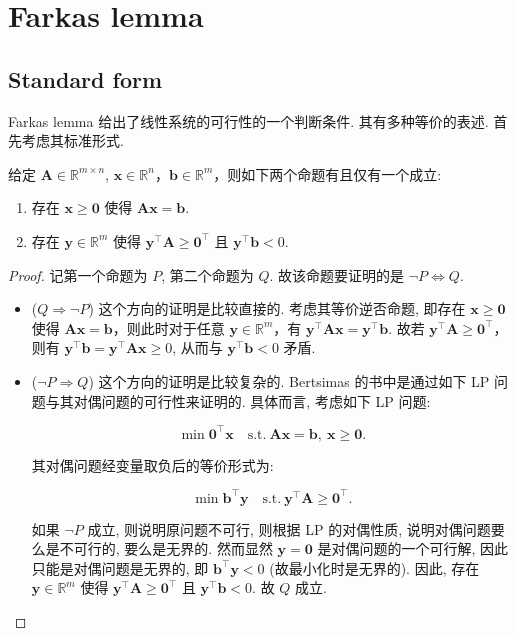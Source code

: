 \section{Farkas lemma}

\subsection{Standard form}

Farkas lemma 给出了线性系统的可行性的一个判断条件. 其有多种等价的表述. 首先考虑其标准形式.


\begin{thmblock}  给定 $\bm{A} \in \mathbb{R}^{m \times n}$, $\bm{x} \in \mathbb{R}^n$，$\bm{b} \in \mathbb{R}^m$，则如下两个命题有且仅有一个成立:

\begin{enumerate}
\item {}存在 $\bm{x} \geq \bm{0}$ 使得 $\bm{A}\bm{x} = \bm{b}$.


\item {}存在 $\bm{y} \in \mathbb{R}^m$ 使得 $\bm{y}^\top \bm{A} \geq \bm{0}^\top$ 且 $\bm{y}^\top \bm{b} < 0$.


\end{enumerate}


\begin{proof}{}
记第一个命题为 $P$, 第二个命题为 $Q$. 故该命题要证明的是 $\neg P \iff Q$.

\begin{itemize}
\item {}($Q \Rightarrow \neg P$) 这个方向的证明是比较直接的. 考虑其等价逆否命题, 即存在 $\bm{x} \geq \bm{0}$ 使得 $\bm{A}\bm{x} = \bm{b}$，则此时对于任意 $\bm{y} \in \mathbb{R}^m$，有 $\bm{y}^\top \bm{A}\bm{x} = \bm{y}^\top \bm{b}$. 故若 $\bm{y}^\top \bm{A} \geq \bm{0}^\top$，则有 $\bm{y}^\top \bm{b} = \bm{y}^\top \bm{A}\bm{x} \geq 0$, 从而与 $\bm{y}^\top \bm{b} < 0$ 矛盾.


\item {}($\neg P \Rightarrow Q$) 这个方向的证明是比较复杂的. Bertsimas 的书中是通过如下 LP 问题与其对偶问题的可行性来证明的. 具体而言, 考虑如下 LP 问题:

\[
\min \bm{0}^\top \bm{x} \quad \text{s.t.}~ \bm{A}\bm{x} = \bm{b},~ \bm{x} \geq \bm{0}.
\]

其对偶问题经变量取负后的等价形式为:

\[
\min \bm{b}^\top \bm{y} \quad \text{s.t.}~ \bm{y}^\top \bm{A} \geq \bm{0}^\top.
\]

如果 $\neg P$ 成立, 则说明原问题不可行, 则根据 LP 的对偶性质, 说明对偶问题要么是不可行的, 要么是无界的. 然而显然 $\bm{y} = \bm{0}$ 是对偶问题的一个可行解, 因此只能是对偶问题是无界的, 即 $\bm{b}^\top \bm{y} < 0$ (故最小化时是无界的). 因此, 存在 $\bm{y} \in \mathbb{R}^m$ 使得 $\bm{y}^\top \bm{A} \geq \bm{0}^\top$ 且 $\bm{y}^\top \bm{b} < 0$. 故 $Q$ 成立.


\end{itemize}

\end{proof}

\end{thmblock}

